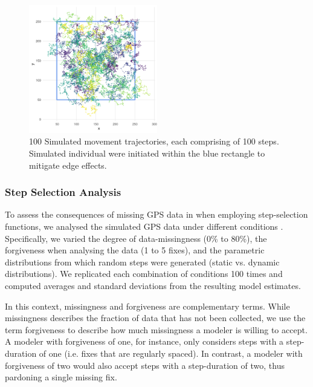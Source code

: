 \documentclass[abstract=on,10pt,a4paper,bibliography=totocnumbered]{article}
\begin{document}
\begin{figure}
  \begin{center}
  \includegraphics[width = 0.5\textwidth]{99_Simulations.png}
  \caption{100 Simulated movement trajectories, each comprising of 100 steps.
  Simulated individual were initiated within the blue rectangle to mitigate edge
  effects.}
  \label{Simulations}
  \end{center}
\end{figure}

\subsubsection{Step Selection Analysis}
To assess the consequences of missing GPS data in when employing step-selection
functions, we analysed the simulated GPS data under different conditions
. Specifically, we varied the degree of data-missingness (0\% to
80\%), the forgiveness when analysing the data (1 to 5 fixes), and the
parametric distributions from which random steps were generated (static vs.
dynamic distributions). We replicated each combination of conditions 100 times
and computed averages and standard deviations from the resulting model
estimates.

In this context, missingness and forgiveness are complementary terms. While
missingness describes the fraction of data that has not been collected, we use
the term forgiveness to describe how much missingness a modeler is willing to
accept. A modeler with forgiveness of one, for instance, only considers steps
with a step-duration of one (i.e. fixes that are regularly spaced). In contrast,
a modeler with forgiveness of two would also accept steps with a step-duration
of two, thus pardoning a single missing fix.
\end{document}
